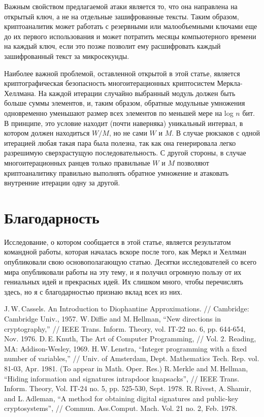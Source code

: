 \documentclass[a4paper,12pt]{report}
\begin{document}
Важным свойством предлагаемой атаки является то, что она направлена на открытый ключ, а не на отдельные зашифрованные тексты. Таким образом, криптоаналитик может работать с резервными или малообъемными ключами еще до их первого использования и может потратить месяцы компьютерного времени на каждый ключ, если это позже позволит ему расшифровать каждый зашифрованный текст за микросекунды.

Наиболее важной проблемой, оставленной открытой в этой статье, является криптографическая безопасность многоитерационных криптосистем Меркла-Хеллмана. На каждой итерации случайно выбранный модуль должен быть больше суммы элементов, и, таким образом, обратные модульные умножения одновременно уменьшают размер всех элементов по меньшей мере на log $n$ бит. В принципе, это условие находит (почти наверняка) уникальный интервал, в котором должен находиться $W/M$, но не сами $W$ и $M$. В случае рюкзаков с одной итерацией любая такая пара была полезна, так как она генерировала легко разрешимую сверхрастущую последовательность. С другой стороны, в случае многоитерационных ранцев только правильные $W$ и $M$ позволяют криптоаналитику правильно выполнять обратное умножение и атаковать внутренние итерации одну за другой.

\chapter{Благодарность}

Исследование, о котором сообщается в этой статье, является результатом командной работы, которая началась вскоре после того, как Меркл и Хеллман опубликовали свою основополагающую статью. Десятки исследователей со всего мира опубликовали работы на эту тему, и я получил огромную пользу от их гениальных идей и прекрасных идей. Их слишком много, чтобы перечислять здесь, но я с благодарностью признаю вклад всех из них.

\newpage

\begin{thebibliography}{99}
J.\,W.\,Cassels. An Introduction to Diophantine Approximations. // Cambridge: Cambridge Univ., 1957. 
W.\,Diffie and M.\,Hellman, “New directions in cryptography,” // IEEE Trans. Inform. Theory, vol. IT-22 no. 6, pp. 644-654, Nov. 1976. 
D.\,E.\,Knuth, The Art of Computer Programming, // Vol. 2. Reading, MA: Addison-Wesley, 1969. 
H.\,W.\,Lenstra, “Integer programming with a fixed number of variables,” // Univ. of Amsterdam, Dept. Mathematics Tech. Rep. vol. 81-03, Apr. 1981. (To appear in Math. Oper. Res.)  
R.\,Merkle and M.\,Hellman, “Hiding information and signatures intrapdoor knapsacks”, // IEEE Trans. Inform. Theory, Vol. IT-24 no. 5, pp. 525-530, Sept. 1978. 
R.\,Rivest, A.\,Shamir, and L.\,Adleman, “A method for obtaining digital signatures and public-key cryptosystems”, // Commun. Ass.Comput. Mach. Vol. 21 no. 2, Feb. 1978.  
\end{thebibliography}
\end{document}
